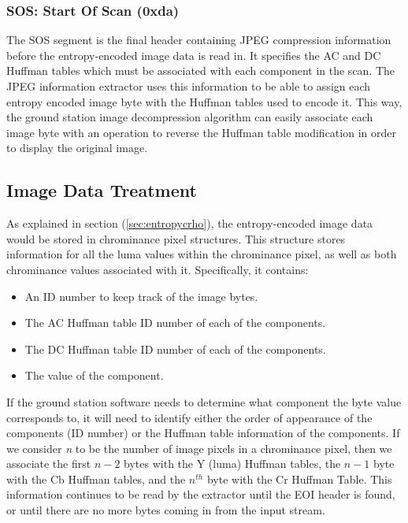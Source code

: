 \subsubsection{SOS: Start Of Scan (0xda)}

The SOS segment is the final header containing JPEG
compression information before the entropy-encoded
image data is read in. It specifies the AC and DC Huffman tables
which must be associated with each component in the scan.
The JPEG information extractor uses this information to be
able to assign each entropy encoded image byte with
the Huffman tables used to encode it. This way, the 
ground station image decompression algorithm can 
easily associate each image byte with an operation to
reverse the Huffman table modification in order to display
the original image.

\subsection{Image Data Treatment}

As explained in section (\ref{sec:entropycrho}), the entropy-encoded
image data would be stored in chrominance pixel structures. This structure
stores information for all the luma values within the chrominance pixel, 
as well as both chrominance values associated with it. Specifically, it contains:
\begin{itemize}
	\item An ID number to keep track of the image bytes.
	\item The AC Huffman table ID number of each of the components.
	\item The DC Huffman table ID number of each of the components.
	\item The value of the component.
\end{itemize}
If the ground station software needs to determine what 
component the byte value corresponds to, it will need to identify either 
the order of appearance of the components (ID number) or the 
Huffman table information of the components.
If we consider \emph{n} to be the number of image pixels in a chrominance pixel, then 
we associate the first $n - 2$ bytes with the Y (luma) Huffman tables, the $n - 1$ byte with the Cb Huffman tables, and 
the $n^{th}$ byte with the Cr Huffman Table. 
This information continues to be read by the extractor 
until the EOI header is found, or until there are no more bytes coming in from the input stream.


